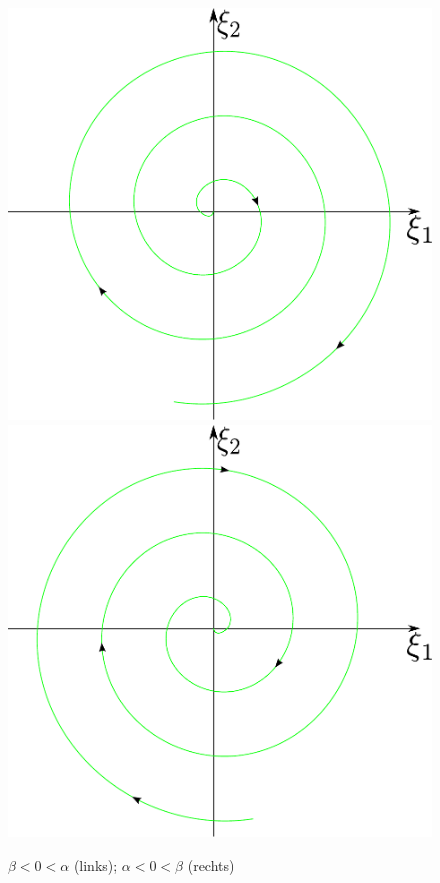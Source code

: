 \documentclass[a4paper, 13pt]{scrreprt}
\theoremstyle{definition} \newtheorem{definition}{Definition}[section]
\begin{document}
\begin{figure}[htpb]
		\centering
		\includegraphics[height=0.25\textheight]{img/lin_sys/lin_sys_7_1.pdf}
		\includegraphics[height=0.25\textheight]{img/lin_sys/lin_sys_7_2.pdf}
		\caption{$\beta < 0 < \alpha$ (links); $\alpha < 0 < \beta$ (rechts)}


\end{figure}
\end{document}
